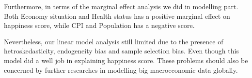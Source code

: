 \documentclass[11pt,a4paper,]{article}
\begin{document}
Furthermore, in terms of the marginal effect analysis we did in modelling part. Both Economy situation and Health status has a positive marginal effect on happiness score, while CPI and Population has a negative score.

Nevertheless, our linear model analysis still limited due to the presence of hetroskedasticity, endogeneity bias and sample selection bias. Even though this model did a well job in explaining happiness score. These problems should also be concerned by further researches in modelling big macroeconomic data globally.

\printbibliography[title=Acknowledgement]
\end{document}
